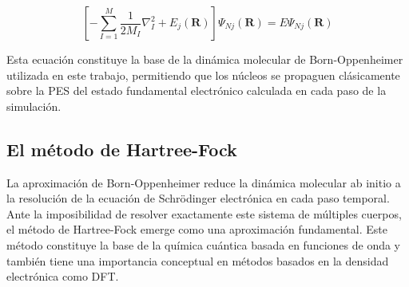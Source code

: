 \begin{equation}
    \left[ -\sum_{I=1}^{M} \frac{1}{2M_I} \nabla^2_I + E_j(\mathbf{R}) \right] \Psi_{Nj}(\mathbf{R}) = E \Psi_{Nj}(\mathbf{R})
    \label{eq:schrodinger_nuclear_decoupled}
\end{equation}

Esta ecuación constituye la base de la dinámica molecular de Born-Oppenheimer utilizada en este trabajo, permitiendo que los núcleos se propaguen clásicamente sobre la PES del estado fundamental electrónico calculada en cada paso de la simulación.

\subsection{El método de Hartree-Fock}

La aproximación de Born-Oppenheimer reduce la dinámica molecular ab initio a la resolución de la ecuación de Schrödinger electrónica en cada paso temporal. Ante la imposibilidad de resolver exactamente este sistema de múltiples cuerpos, el método de Hartree-Fock emerge como una aproximación fundamental. Este método constituye la base de la química cuántica basada en funciones de onda y también tiene una importancia conceptual en métodos basados en la densidad electrónica como DFT.

